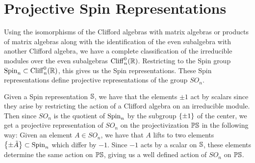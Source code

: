 %
\section{Projective Spin Representations}
%
Using the isomorphisms of the Clifford algebras with matrix algebras
or products of matrix algebras along with the identification of the
even subalgebra with another Clifford algebra, we have a complete classification
of the irreducible modules over the even subalgebras $\Cliff^0_{n}(\R)$.
Restricting to the Spin group $\Spin_n \subset \Cliff^0_n(\R)$, this gives us
the Spin representations. These Spin representations define projective
representations of the group $SO_n$.
%
\iffalse
\begin{prop}
 Let $G$ be a group, and $V$ a finite dimensional irreducible representation of $G$.
 Then every element of the center acts by scalars, i.e. for $g \in Z(G)$, there
 exists a scalar $\lambda_g$ such that for all $v$ in $V$, we have
 \[
  g \cdot v = \lambda_g v
 \]
\end{prop}
%
\begin{proof}
 Let $g \in Z(G)$. Then for every $h \in G$ and $v \in V$, we have that
 \[
  h \cdot (g\cdot v) = g \cdot (h\cdot v)
 \]
 Therefore, the action of $g$ defines a $G$-equivariant map $V \to V$, which
 by Schur's Lemma must necessarily be a scalar multiple of the identity.
\end{proof}
\fi
%
Given a Spin representation $\S$, we have that the elements
$\pm 1$ act by scalars since they arise by restricting the action of a Clifford
algebra on an irreducible module. Then since $SO_n$ is the quotient of $\Spin_n$
by the subgroup $\set{\pm 1}$ of the center, we get a projective representation of
$SO_n$ on the projectivization $\P\S$ in the following way:
Given an element $A \in SO_n$, we have that $A$ lifts to two elements
$\set{\pm \tilde{A}} \subset \Spin_n$ which differ by $-1$. Since $-1$
acts by a scalar on $\S$, these elements determine the same action on
$\P\S$, giving us a well defined action of $SO_n$ on $\P\S$.

